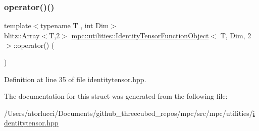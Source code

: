 \subsubsection{\texorpdfstring{operator()()}{operator()()}}
{\footnotesize\ttfamily template$<$typename T , int Dim$>$ \\
blitz\+::\+Array$<$T,2$>$ \mbox{\hyperlink{structmpc_1_1utilities_1_1_identity_tensor_function_object}{mpc\+::utilities\+::\+Identity\+Tensor\+Function\+Object}}$<$ T, Dim, 2 $>$\+::operator() (\begin{DoxyParamCaption}{ }\end{DoxyParamCaption})\hspace{0.3cm}{\ttfamily [inline]}}



Definition at line 35 of file identitytensor.\+hpp.



The documentation for this struct was generated from the following file\+:\begin{DoxyCompactItemize}
\item 
/\+Users/atorlucci/\+Documents/github\+\_\+threecubed\+\_\+repos/mpc/src/mpc/utilities/\mbox{\hyperlink{identitytensor_8hpp}{identitytensor.\+hpp}}\end{DoxyCompactItemize}
